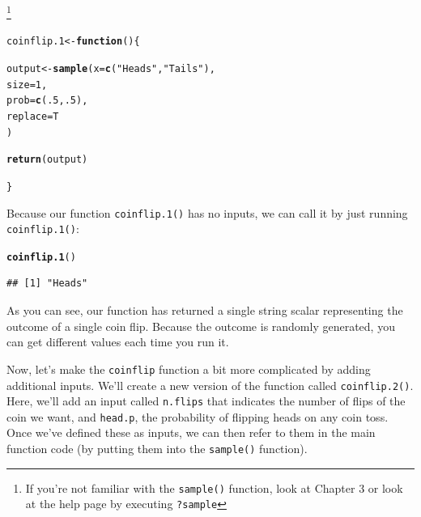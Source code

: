 \documentclass{tufte-book}\usepackage[]{graphicx}\usepackage[]{color}
\makeatletter
\newcommand{\hlnum}[1]{\textcolor[rgb]{0.686,0.059,0.569}{#1}}%
\newcommand{\hlstr}[1]{\textcolor[rgb]{0.192,0.494,0.8}{#1}}%
\newcommand{\hlstd}[1]{\textcolor[rgb]{0.345,0.345,0.345}{#1}}%
\newcommand{\hlkwa}[1]{\textcolor[rgb]{0.161,0.373,0.58}{\textbf{#1}}}%
\newcommand{\hlkwb}[1]{\textcolor[rgb]{0.69,0.353,0.396}{#1}}%
\newcommand{\hlkwc}[1]{\textcolor[rgb]{0.333,0.667,0.333}{#1}}%
\newcommand{\hlkwd}[1]{\textcolor[rgb]{0.737,0.353,0.396}{\textbf{#1}}}%
\newenvironment{kframe}{%
 \def\at@end@of@kframe{}%
 \ifinner\ifhmode%
  \def\at@end@of@kframe{\end{minipage}}%
  \begin{minipage}{\columnwidth}%
 \fi\fi%
 \def\FrameCommand##1{\hskip\@totalleftmargin \hskip-\fboxsep
 \colorbox{shadecolor}{##1}\hskip-\fboxsep
     \hskip-\linewidth \hskip-\@totalleftmargin \hskip\columnwidth}%
 \MakeFramed {\advance\hsize-\width
   \@totalleftmargin\z@ \linewidth\hsize
   \@setminipage}}%
 {\par\unskip\endMakeFramed%
 \at@end@of@kframe}
\newenvironment{knitrout}{}{} %
\makeatother
\begin{document}
\begin{footnotesize}
\footnote{If you're not familiar with the \texttt{sample()} function, look at Chapter 3 or look at the help page by executing \texttt{?sample}}

\begin{knitrout}
\color{fgcolor}\begin{kframe}
\begin{alltt}
\hlstd{coinflip.1} \hlkwb{<-} \hlkwa{function} \hlstd{() \{}

  \hlstd{output} \hlkwb{<-} \hlkwd{sample}\hlstd{(}\hlkwc{x} \hlstd{=} \hlkwd{c}\hlstd{(}\hlstr{"Heads"}\hlstd{,} \hlstr{"Tails"}\hlstd{),}
                   \hlkwc{size} \hlstd{=} \hlnum{1}\hlstd{,}
                   \hlkwc{prob} \hlstd{=} \hlkwd{c}\hlstd{(}\hlnum{.5}\hlstd{,} \hlnum{.5}\hlstd{),}
                   \hlkwc{replace} \hlstd{= T}
                   \hlstd{)}

  \hlkwd{return}\hlstd{(output)}

\hlstd{\}}
\end{alltt}
\end{kframe}
\end{knitrout}

Because our function \texttt{coinflip.1()} has no inputs, we can call it by just running \texttt{coinflip.1()}:

\begin{knitrout}
\color{fgcolor}\begin{kframe}
\begin{alltt}
\hlkwd{coinflip.1}\hlstd{()}
\end{alltt}
\begin{verbatim}
## [1] "Heads"
\end{verbatim}
\end{kframe}
\end{knitrout}

As you can see, our function has returned a single string scalar representing the outcome of a single coin flip. Because the outcome is randomly generated, you can get different values each time you run it.

Now, let's make the \texttt{coinflip} function a bit more complicated by adding additional inputs. We'll create a new version of the function called \texttt{coinflip.2()}. Here, we'll add an input called \texttt{n.flips} that indicates the number of flips of the coin we want, and \texttt{head.p}, the probability of flipping heads on any coin toss. Once we've defined these as inputs, we can then refer to them in the main function code (by putting them into the \texttt{sample()} function).


\end{footnotesize}
\end{document}

